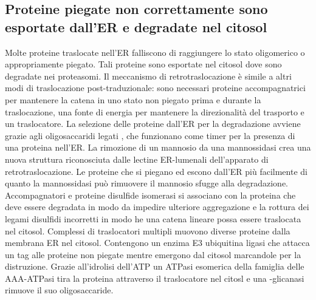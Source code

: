 \subsection{Proteine piegate non correttamente sono esportate dall'ER e degradate nel citosol}
Molte proteine traslocate nell'ER falliscono di raggiungere lo stato oligomerico o appropriamente piegato. Tali proteine sono esportate nel citosol dove sono degradate nei 
proteasomi. Il meccanismo di retrotraslocazione \`e simile a altri modi di traslocazione post-traduzionale: sono necessari proteine accompagnatrici per mantenere la catena in uno
stato non piegato prima e durante la traslocazione, una fonte di energia per mantenere la direzionalit\`a del trasporto e un traslocatore. La selezione delle proteine dall'ER per la 
degradazione avviene grazie agli oligosaccaridi legati , che funzionano come timer per la presenza di una proteina nell'ER. La rimozione di un mannosio da una mannossidasi crea
una nuova struttura riconosciuta dalle lectine ER-lumenali dell'apparato di retrotraslocazione. Le proteine che si piegano ed escono dall'ER pi\`u facilmente di quanto la mannossidasi 
pu\`o rimuovere il mannosio sfugge alla degradazione. Accompagnatori e proteine disulfide isomerasi si associano con la proteina che deve essere degradata in modo da impedire ulteriore
aggregazione e la rottura dei legami disulfidi incorretti in modo he una catena lineare possa essere traslocata nel citosol. Complessi di traslocatori multipli muovono diverse proteine
dalla membrana ER nel citosol. Contengono un enzima E3 ubiquitina ligasi che attacca un tag alle proteine non piegate mentre emergono dal citosol marcandole per la distruzione. Grazie
all'idrolisi dell'ATP un ATPasi esomerica della famiglia delle AAA-ATPasi tira la proteina attraverso il traslocatore nel citosl e una -glicanasi rimuove il suo oligosaccaride. 
